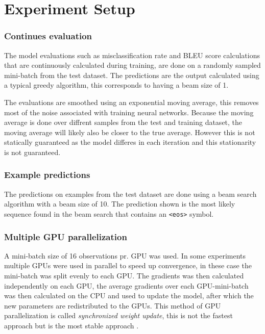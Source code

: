 
\section{Experiment Setup}

\subsubsection{Continues evaluation}
The model evaluations such as misclassification rate and BLEU score calculations that are continuously calculated during training, are done on a randomly sampled mini-batch from the test dataset. The predictions are the output calculated using a typical greedy algorithm, this corresponds to having a beam size of 1.

The evaluations are smoothed using an exponential moving average, this removes most of the noise associated with training neural networks. Because the moving average is done over diffrent samples from the test and training dataset, the moving average will likely also be closer to the true average. However this is not statically guaranteed as the model differes in each iteration and this stationarity is not guaranteed.

\subsubsection{Example predictions}
The predictions on examples from the test dataset are done using a beam search algorithm with a beam size of 10. The prediction shown is the most likely sequence found in the beam search that contains an \texttt{<eos>} symbol.

\subsubsection{Multiple GPU parallelization}
A mini-batch size of 16 observations pr. GPU was used. In some experiments multiple GPUs were used in parallel to speed up convergence, in these case the mini-batch was split evenly to each GPU. The gradients was then calculated independently on each GPU, the average gradients over each GPU-mini-batch was then calculated on the CPU and used to update the model, after which the new parameters are redistributed to the GPUs. This method of GPU parallelization is called \textit{synchronized weight update}, this is not the fastest approach but is the most stable approach \cite{citation-needed}.

